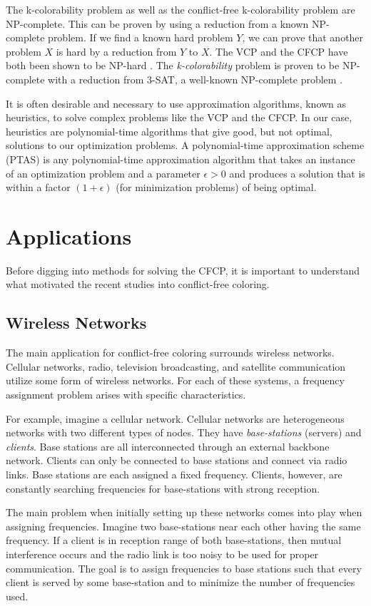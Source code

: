 \documentclass{sig-alternate}
\begin{document}
The k-colorability problem as well as the conflict-free k-colorability problem are NP-complete. This can be proven by using a reduction from a known NP-complete problem. If we find a known hard problem $Y$, we can prove that another problem $X$ is hard by a reduction from $Y$ to $X$. The VCP and the CFCP have both been shown to be NP-hard \cite{abel2017three,moret1998theory}. The \emph{k-colorability} problem is proven to be NP-complete with a reduction from 3-SAT, a well-known NP-complete problem \cite{sharma2012new}.

It is often desirable and necessary to use approximation algorithms, known as heuristics, to solve complex problems like the VCP and the CFCP. In our case, heuristics are polynomial-time algorithms that give good, but not optimal, solutions to our optimization problems. A polynomial-time approximation scheme (PTAS) is any polynomial-time approximation algorithm that takes an instance of an optimization problem and a parameter $\epsilon > 0$ and produces a solution that is within a factor $(1 + \epsilon)$ (for minimization problems) of being optimal.

\section{Applications}
Before digging into methods for solving the CFCP, it is important to understand what motivated the recent studies into conflict-free coloring.

\subsection{Wireless Networks}
The main application for conflict-free coloring surrounds wireless networks. Cellular networks, radio, television broadcasting, and satellite communication utilize some form of wireless networks. For each of these systems, a frequency assignment problem arises with specific characteristics.

For example, imagine a cellular network. Cellular networks are heterogeneous networks with two different types of nodes. They have \emph{base-stations} (servers) and \emph{clients}. Base stations are all interconnected through an external backbone network. Clients can only be connected to base stations and connect via radio links. Base stations are each assigned a fixed frequency. Clients, however, are constantly searching frequencies for base-stations with strong reception.

The main problem when initially setting up these networks comes into play when assigning frequencies. Imagine two base-stations near each other having the same frequency. If a client is in reception range of both base-stations, then mutual interference occurs and the radio link is too noisy to be used for proper communication. The goal is to assign frequencies to base stations such that every client is served by some base-station and to minimize the number of frequencies used.
\end{document}
